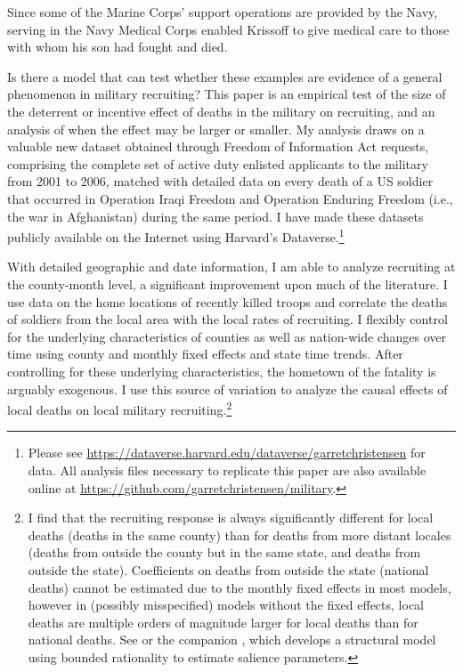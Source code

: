 \documentclass[12pt] {article}
\begin{document}
Since some of the Marine Corps' support operations are provided by the Navy, serving in the Navy Medical Corps enabled Krissoff to give medical care to those with whom his son had fought and died. 

Is there a model that can test whether these examples are evidence of a general phenomenon in military recruiting? This paper is an empirical test of the size of the deterrent or incentive effect of deaths in the military on recruiting, and an analysis of when the effect may be larger or smaller. My analysis draws on a valuable new dataset obtained through Freedom of Information Act requests, comprising the complete set of active duty enlisted applicants to the military from 2001 to 2006, matched with detailed data on every death of a US soldier that occurred in Operation Iraqi Freedom and Operation
Enduring Freedom (i.e., the war in Afghanistan) during the same period. I have made these datasets publicly available on the Internet using Harvard's Dataverse.\footnote{Please see \url{https://dataverse.harvard.edu/dataverse/garretchristensen} for data. All analysis files necessary to replicate this paper are also available online at \url{https://github.com/garretchristensen/military}.}

With detailed geographic and date information, I am able to analyze recruiting at the county-month level, a significant improvement upon much of the literature. I use data on the home locations of recently killed troops and correlate the deaths of soldiers from the local area with the local rates of recruiting. I flexibly control for the underlying characteristics of counties as well as nation-wide changes over time using county and monthly fixed effects and state time trends. After controlling for these underlying characteristics, the hometown of the fatality is arguably exogenous. I use this source of variation to analyze the causal effects of local deaths on local military recruiting.\footnote{I find that the recruiting response is always significantly different
for local deaths (deaths in the same county) than for deaths from
more distant locales (deaths from outside the county but in the same
state, and deaths from outside the state). Coefficients on deaths from outside the state (national deaths) cannot be estimated due to the monthly fixed effects in most models, however in (possibly misspecified) models without the fixed effects, local deaths
are multiple orders of magnitude larger for local deaths than
for national deaths. See \cite{ChettySalience} or the companion \cite{ChettyEarly},
which develops a structural model using bounded rationality to estimate salience parameters.%
} 
\end{document}
